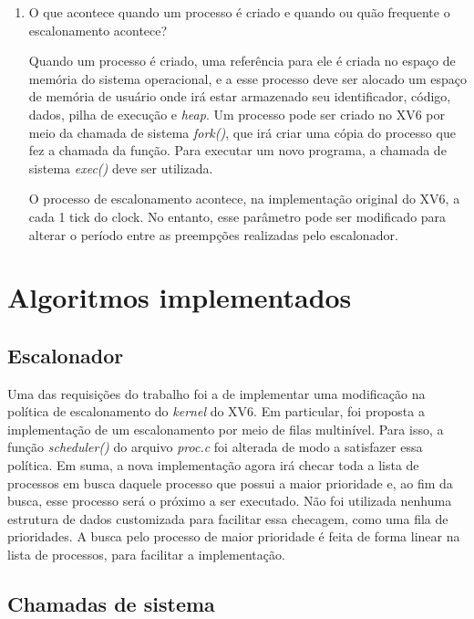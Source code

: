 \documentclass{article}
\begin{document}
\begin{enumerate}
      \item O que acontece quando um processo é criado e quando ou quão
            frequente o escalonamento acontece?

            Quando um processo é criado, uma referência para ele é
            criada no espaço de memória do sistema operacional, e a esse
            processo deve ser alocado um espaço de memória de
            usuário onde irá
            estar armazenado seu identificador, código, dados, pilha de
            execução e \textit{heap}. Um processo pode ser criado no XV6 por
            meio da chamada de sistema \textit{fork()}, que irá criar uma cópia
            do processo que fez a chamada da função. Para executar um novo
            programa, a chamada
            de sistema
            \textit{exec()}
            deve ser utilizada.

            O processo de escalonamento acontece, na implementação original do
            XV6, a cada 1 tick do clock. No entanto, esse parâmetro pode ser
            modificado
            para alterar o período entre as preempções realizadas pelo
            escalonador.

\end{enumerate}

\section{Algoritmos implementados}

\subsection{Escalonador}

Uma das requisições do trabalho foi a de implementar uma modificação na
política de escalonamento do \textit{kernel} do XV6. Em particular, foi
proposta a implementação de um escalonamento por meio de filas multinível. Para
isso, a função
\textit{scheduler()} do arquivo \textit{proc.c} foi alterada de modo a
satisfazer essa política. Em suma, a nova implementação agora irá
checar toda a lista de processos em busca daquele processo que possui a maior
prioridade e, ao fim da busca, esse processo será o próximo a ser executado.
Não foi utilizada nenhuma estrutura de dados
customizada para facilitar essa checagem, como uma fila de prioridades. A busca
pelo processo de maior prioridade é feita de forma linear na lista de
processos, para facilitar a implementação.

\subsection{Chamadas de sistema}
\end{document}
